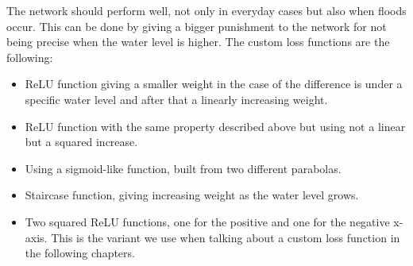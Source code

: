 \documentclass{article}
\newenvironment{itemizedot}{\begin{itemize} \renewcommand{\labelitemi}{$\bullet$}\renewcommand{\labelitemii}{$\bullet$}\renewcommand{\labelitemiii}{$\bullet$}\renewcommand{\labelitemiv}{$\bullet$}}{\end{itemize}}
\begin{document}
The network should perform well, not only in everyday cases but also when
floods occur. This can be done by giving a bigger punishment to the network
for not being precise when the water level is higher. The custom loss
functions are the following:
\begin{itemizedot}
  \item ReLU function giving a smaller weight in the case of the difference is
  under a specific water level and after that a linearly increasing weight.
  
  \item ReLU function with the same property described above but using not a
  linear but a squared increase.
  
  \item Using a sigmoid-like function, built from two different parabolas.
  
  \item Staircase function, giving increasing weight as the water level grows.
  
  \item Two squared ReLU functions, one for the positive and one for the
  negative x-axis. This is the variant we use when talking about a custom loss
  function in the following chapters.
\end{itemizedot}
\end{document}
